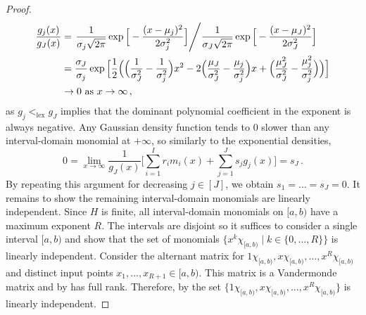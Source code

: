 \documentclass[a4paper,UKenglish,cleveref, autoref,mathscr]{lipics-v2019}
\newcommand{\1}{\mathbbm{1}}
\begin{document}
\begin{proof}
	\begin{equation*}
	\begin{split}
	\frac{g_j(x)}{g_J(x)} & = \left. \frac{1}{\sigma_j\sqrt{2\pi}} \exp\Big[ - \frac{(x - \mu_j)^2}{2\sigma_j^2}\Big] \middle/ \frac{1}{\sigma_J\sqrt{2\pi}} \exp\Big[- \frac{(x - \mu_J)^2}{2\sigma_J^2}\Big] \right. \\
	& = \frac{\sigma_J}{\sigma_j} \exp\Big[\frac{1}{2}\Big( \Big(\frac{1}{\sigma_J^2} - \frac{1}{\sigma_j^2} \Big)x^2 - 2\Big( \frac{\mu_J}{\sigma_J^2} - \frac{\mu_j}{\sigma_j^2}\Big)x  + \Big( \frac{\mu_J^2}{\sigma_J^2} - \frac{\mu_j^2}{\sigma_j^2}\Big)\Big)\Big]\\
	& \rightarrow 0 \text{ as } x \rightarrow \infty\,,
	\end{split}
	\end{equation*}
	as $g_j <_{\text{lex}} g_J$ implies that the dominant polynomial coefficient in the exponent is always negative. Any Gaussian density function tends to $0$ slower than any interval-domain monomial at $+\infty$, so similarly to the exponential densities,
	\begin{equation*}
	0 = \lim_{x \rightarrow \infty} \frac{1}{g_J(x)}\Big[\sum_{i = 1}^{I} r_i m_i(x) + \sum_{j = 1}^J s_j g_j(x)\Big] = s_J\,.
	\end{equation*}
	By repeating this argument for decreasing $j \in [J]$, we obtain $s_1 = \dots = s_J = 0$. It remains to show the remaining interval-domain monomials are linearly independent. Since $H$ is finite, all interval-domain monomials on $[a,b)$ have a maximum exponent $R$. The intervals are disjoint so it suffices to consider a single interval $[a,b)$ and show that the set of monomials $\{x^k\chi_{[a,b)} \mid k \in \{0, \dots, R\}\}$ is linearly independent.
	Consider the alternant matrix for $1\chi_{[a,b)}, x\chi_{[a,b)}, \dots, x^R\chi_{[a,b)}$ and distinct input points $x_1, \dots, x_{R + 1} \in [a,b)$. This matrix is a Vandermonde matrix and by \cite[p.9]{milne33} has full rank. Therefore, by  the set $\{1\chi_{[a,b)}, x\chi_{[a,b)}, \dots, x^R\chi_{[a,b)}\}$ is linearly independent.
\end{proof}

\commonfuncslineardecomp*
\end{document}
